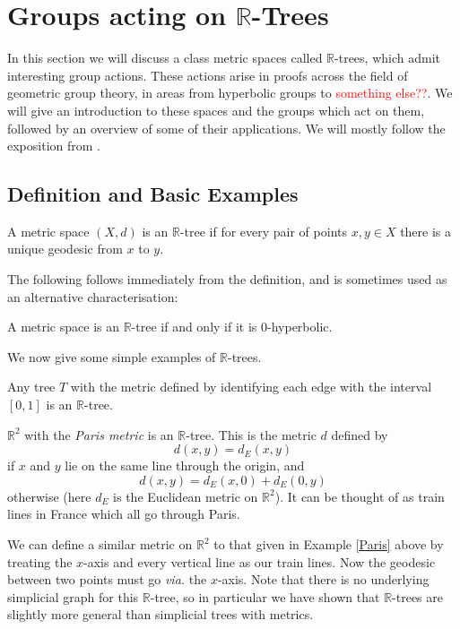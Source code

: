 \section{Groups acting on $\mathbb{R}$-Trees}

In this section we will discuss a class metric spaces called $\mathbb{R}$-trees, which admit interesting group actions. These actions arise in proofs across the field of geometric group theory, in areas from hyperbolic groups to \textcolor{red}{something else??}. We will give an introduction to these spaces and the groups which act on them, followed by an overview of some of their applications. We will mostly follow the exposition from \cite{Bestvina_trees}.
\subsection{Definition and Basic Examples}
\begin{definition}
    A metric space $(X,d)$ is an \textnormal{$\mathbb{R}$-tree} if for every pair of points $x,y\in X$ there is a unique geodesic from $x$ to $y$.
\end{definition}

The following follows immediately from the definition, and is sometimes used as an alternative characterisation:

\begin{proposition}
    A metric space is an $\mathbb{R}$-tree if and only if it is 0-hyperbolic.
\end{proposition}

We now give some simple examples of $\mathbb{R}$-trees.

\begin{example}
    Any tree $T$ with the metric defined by identifying each edge with the interval $[0,1]$ is an $\mathbb{R}$-tree.
\end{example}

\begin{example}\label{Paris}
    $\mathbb{R}^2$ with the \textit{Paris metric} is an $\mathbb{R}$-tree. This is the metric $d$ defined by\[d(x,y)=d_E(x,y)\]if $x$ and $y$ lie on the same line through the origin, and\[d(x,y)=d_E(x,0)+d_E(0,y)\] otherwise (here $d_E$ is the Euclidean metric on $\mathbb{R}^2$). It can be thought of as train lines in France which all go through Paris.
\end{example}

\begin{example}\label{xtrains}
    We can define a similar metric on $\mathbb{R}^2$ to that given in Example \ref{Paris} above by treating the $x$-axis and every vertical line as our train lines. Now the geodesic between two points must go \textit{via.} the $x$-axis. Note that there is no underlying simplicial graph for this $\mathbb{R}$-tree, so in particular we have shown that $\mathbb{R}$-trees are slightly more general than simplicial trees with metrics.
\end{example}

